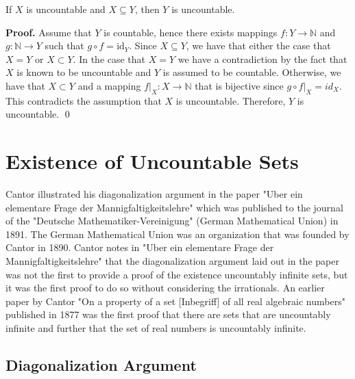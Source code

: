 \documentclass[10pt, letterpaper]{article}
\begin{document}
\begin{theorem}
If $X$ is uncountable and $X \subseteq Y$, then $Y$ is uncountable.

\textbf{Proof.} Assume that $Y$ is countable, hence there exists mappings $f : Y \to \mathbb{N}$ and
$g : \mathbb{N} \to Y$ such that $g \circ f = \text{id}_Y$. Since $X \subseteq Y$, we have that either the case that
$X = Y$ or $X \subset Y$. In the case that $X = Y$ we have a contradiction by the fact that $X$ is known to be
uncountable and $Y$ is assumed to be countable. Otherwise, we have that $X \subset Y$ and a mapping
$f|_X : X \to \mathbb{N}$ that is bijective since $g \circ f|_X = id_X$. This contradicts the assumption that $X$ is
uncountable. Therefore, $Y$ is uncountable. \qed
\end{theorem}

\section{Existence of Uncountable Sets}

Cantor illustrated his diagonalization argument in the paper "Uber ein elementare Frage der Mannigfaltigkeitslehre"
which was published to the journal of the "Deutsche Mathematiker-Vereinigung" (German Mathematical Union) in 1891. The
German Mathematical Union was an organization that was founded by Cantor in 1890. Cantor notes in "Uber ein elementare
Frage der Mannigfaltigkeitslehre" that the diagonalization argument laid out in the paper was not the first to provide a
proof of the existence uncountably infinite sets, but it was the first proof to do so without considering the
irrationals. An earlier paper by Cantor "On a property of a set [Inbegriff] of all real algebraic numbers" published in
1877 was the first proof that there are sets that are uncountably infinite and further that the set of real numbers is
uncountably infinite.

\subsection{Diagonalization Argument}
\end{document}

